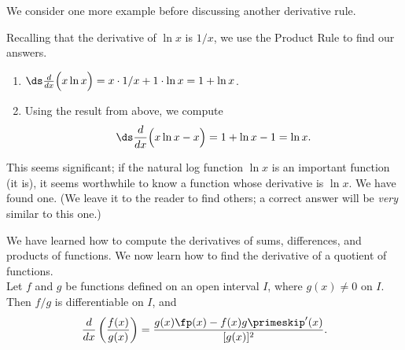 We consider one more example before discussing another derivative rule.

{Recalling that the derivative of $\ln x$ is $1/x$, we use the Product Rule to find our answers.
\begin{enumerate}
	\item	$\ds \frac{d}{dx}\Big(x\ln x\Big) = x\cdot 1/x + 1\cdot \ln x = 1+\ln x$. 
	\item	Using the result from above, we compute
	\[\ds \frac{d}{dx}\Big(x\ln x-x\Big) = 1+\ln x-1 = \ln x.\]
\end{enumerate}
This seems significant; if the natural log function $\ln x$ is an important function (it is), it seems worthwhile to know a function whose derivative is $\ln x$. We have found one. (We leave it to the reader to find others; a correct answer will be \textit{very} similar to this one.)}

We have learned how to compute the derivatives of sums, differences, and products of functions. We now learn how to find the derivative of a quotient of functions.\\

{Let $f$ and $g$ be functions defined on an open interval $I$, where $g(x) \neq 0$ on $I$. Then $f/g$ is differentiable on $I$, and \[\frac{d}{dx}\left(\frac{f(x)}{g(x)}\right) = \frac{g(x)\fp(x) - f(x)g\primeskip'(x)}{[g(x)]^2}.\]}


